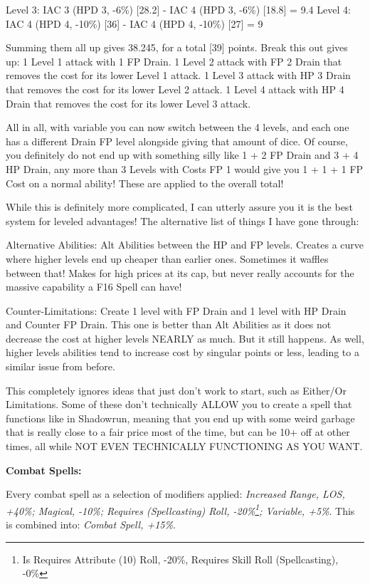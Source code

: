 \begin{multicols*}{2}
	Level 3: IAC 3 (HPD 3, -6\%) [28.2] - IAC 4 (HPD 3, -6\%) [18.8] = 9.4
	Level 4: IAC 4 (HPD 4, -10\%) [36] - IAC 4 (HPD 4, -10\%) [27] = 9
	
	Summing them all up gives 38.245, for a total [39] points.
	Break this out gives up:
	1 Level 1 attack with 1 FP Drain.
	1 Level 2 attack with FP 2 Drain that removes the cost for its lower Level 1 attack.
	1 Level 3 attack with HP 3 Drain that removes the cost for its lower Level 2 attack.
	1 Level 4 attack with HP 4 Drain that removes the cost for its lower Level 3 attack.
	
	All in all, with variable you can now switch between the 4 levels, and each one has a different Drain FP level alongside giving that amount of dice. Of course, you definitely do not end up with something silly like 1 + 2 FP Drain and 3 + 4 HP Drain, any more than 3 Levels with Costs FP 1 would give you 1 + 1 + 1 FP Cost on a normal ability! These are applied to the overall total!
	
	While this is definitely more complicated, I can utterly assure you it is the best system for leveled advantages! The alternative list of things I have gone through:
	
	Alternative Abilities: Alt Abilities between the HP and FP levels. Creates a curve where higher levels end up cheaper than earlier ones. Sometimes it waffles between that! Makes for high prices at its cap, but never really accounts for the massive capability a F16 Spell can have!
	
	Counter-Limitations: Create 1 level with FP Drain and 1 level with HP Drain and Counter FP Drain. This one is better than Alt Abilities as it does not decrease the cost at higher levels NEARLY as much. But it still happens. As well, higher levels abilities tend to increase cost by singular points or less, leading to a similar issue from before.
	
	This completely ignores ideas that just don't work to start, such as Either/Or Limitations. Some of these don't technically ALLOW you to create a spell that functions like in Shadowrun, meaning that you end up with some weird garbage that is really close to a fair price most of the time, but can be 10+ off at other times, all while NOT EVEN TECHNICALLY FUNCTIONING AS YOU WANT.
	
	\textbf{Combat Spells:}
	
	Every combat spell as a selection of modifiers applied: \textit{Increased Range, LOS, +40\%; Magical, -10\%; Requires (Spellcasting) Roll, -20\%\footnote{Is Requires Attribute (10) Roll, -20\%, Requires Skill Roll (Spellcasting), -0\%}; Variable, +5\%}. This is combined into: \textit{Combat Spell, +15\%}.
	

\end{multicols*}
